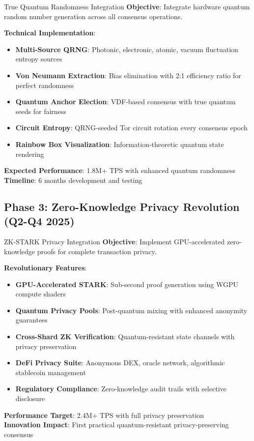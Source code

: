 \documentclass[11pt,a4paper]{article}
\begin{document}
\begin{phasebox}{True Quantum Randomness Integration}
\textbf{Objective}: Integrate hardware quantum random number generation across all consensus operations.

\textbf{Technical Implementation}:
\begin{itemize}
\item \textbf{Multi-Source QRNG}: Photonic, electronic, atomic, vacuum fluctuation entropy sources
\item \textbf{Von Neumann Extraction}: Bias elimination with 2:1 efficiency ratio for perfect randomness
\item \textbf{Quantum Anchor Election}: VDF-based consensus with true quantum seeds for fairness
\item \textbf{Circuit Entropy}: QRNG-seeded Tor circuit rotation every consensus epoch
\item \textbf{Rainbow Box Visualization}: Information-theoretic quantum state rendering
\end{itemize}

\textbf{Expected Performance}: 1.8M+ TPS with enhanced quantum randomness\\
\textbf{Timeline}: 6 months development and testing
\end{phasebox}

\subsection{Phase 3: Zero-Knowledge Privacy Revolution (Q2-Q4 2025)}

\begin{phasebox}{ZK-STARK Privacy Integration}
\textbf{Objective}: Implement GPU-accelerated zero-knowledge proofs for complete transaction privacy.

\textbf{Revolutionary Features}:
\begin{itemize}
\item \textbf{GPU-Accelerated STARK}: Sub-second proof generation using WGPU compute shaders
\item \textbf{Quantum Privacy Pools}: Post-quantum mixing with enhanced anonymity guarantees
\item \textbf{Cross-Shard ZK Verification}: Quantum-resistant state channels with privacy preservation
\item \textbf{DeFi Privacy Suite}: Anonymous DEX, oracle network, algorithmic stablecoin management
\item \textbf{Regulatory Compliance}: Zero-knowledge audit trails with selective disclosure
\end{itemize}

\textbf{Performance Target}: 2.4M+ TPS with full privacy preservation\\
\textbf{Innovation Impact}: First practical quantum-resistant privacy-preserving consensus
\end{phasebox}
\end{document}
